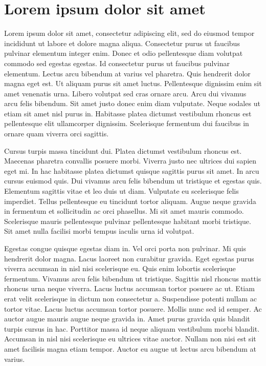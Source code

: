 \section{Lorem ipsum dolor sit amet}

Lorem ipsum dolor sit amet, consectetur adipiscing elit, sed do eiusmod tempor incididunt ut labore et dolore magna aliqua. Consectetur purus ut faucibus pulvinar elementum integer enim. Donec et odio pellentesque diam volutpat commodo sed egestas egestas. Id consectetur purus ut faucibus pulvinar elementum. Lectus arcu bibendum at varius vel pharetra. Quis hendrerit dolor magna eget est. Ut aliquam purus sit amet luctus. Pellentesque dignissim enim sit amet venenatis urna. Libero volutpat sed cras ornare arcu. Arcu dui vivamus arcu felis bibendum. Sit amet justo donec enim diam vulputate. Neque sodales ut etiam sit amet nisl purus in. Habitasse platea dictumst vestibulum rhoncus est pellentesque elit ullamcorper dignissim. Scelerisque fermentum dui faucibus in ornare quam viverra orci sagittis.

Cursus turpis massa tincidunt dui. Platea dictumst vestibulum rhoncus est. Maecenas pharetra convallis posuere morbi. Viverra justo nec ultrices dui sapien eget mi. In hac habitasse platea dictumst quisque sagittis purus sit amet. In arcu cursus euismod quis. Dui vivamus arcu felis bibendum ut tristique et egestas quis. Elementum sagittis vitae et leo duis ut diam. Vulputate eu scelerisque felis imperdiet. Tellus pellentesque eu tincidunt tortor aliquam. Augue neque gravida in fermentum et sollicitudin ac orci phasellus. Mi sit amet mauris commodo. Scelerisque mauris pellentesque pulvinar pellentesque habitant morbi tristique. Sit amet nulla facilisi morbi tempus iaculis urna id volutpat.

Egestas congue quisque egestas diam in. Vel orci porta non pulvinar. Mi quis hendrerit dolor magna. Lacus laoreet non curabitur gravida. Eget egestas purus viverra accumsan in nisl nisi scelerisque eu. Quis enim lobortis scelerisque fermentum. Vivamus arcu felis bibendum ut tristique. Sagittis nisl rhoncus mattis rhoncus urna neque viverra. Lacus luctus accumsan tortor posuere ac ut. Etiam erat velit scelerisque in dictum non consectetur a. Suspendisse potenti nullam ac tortor vitae. Lacus luctus accumsan tortor posuere. Mollis nunc sed id semper. Ac auctor augue mauris augue neque gravida in. Amet purus gravida quis blandit turpis cursus in hac. Porttitor massa id neque aliquam vestibulum morbi blandit. Accumsan in nisl nisi scelerisque eu ultrices vitae auctor. Nullam non nisi est sit amet facilisis magna etiam tempor. Auctor eu augue ut lectus arcu bibendum at varius.

